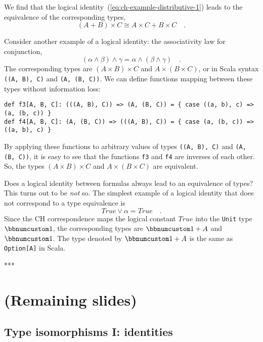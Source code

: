 We find that the logical identity~(\ref{eq:ch-example-distributive-1})
leads to the equivalence of the corresponding types,
\[
\left(A+B\right)\times C\cong A\times C+B\times C\quad.
\]

Consider another example of a logical identity: the associativity
law for conjunction,
\[
\left(\alpha\wedge\beta\right)\wedge\gamma=\alpha\wedge\left(\beta\wedge\gamma\right)\quad.
\]
The corresponding types are $(A\times B)\times C$ and $A\times(B\times C)$,
or in Scala syntax \lstinline!((A, B), C)!
and \lstinline!(A, (B, C))!.
We can define functions mapping between these types without information
loss:
\begin{lstlisting}
def f3[A, B, C]: (((A, B), C)) => (A, (B, C)) = { case ((a, b), c) => (a, (b, c)) }
def f4[A, B, C]: (A, (B, C)) => (((A, B), C)) = { case (a, (b, c)) => ((a, b), c) }
\end{lstlisting}
By applying these functions to arbitrary values of types \lstinline!((A, B), C)!
and \lstinline!(A, (B, C))!,
it is easy to see that the functions \lstinline!f3!
and \lstinline!f4! are
inverses of each other. So, the types $\left(A\times B\right)\times C$
and $A\times\left(B\times C\right)$ are equivalent.

Does a logical identity between formulas always lead to an equivalence
of types? This turns out to be \emph{not} so. The simplest example
of a logical identity that does not correspond to a type equivalence
is
\[
True\vee\alpha=True\quad.
\]
Since the CH correspondence maps the logical constant $True$ into
the \lstinline!Unit! type
$\bbnum 1$, the corresponding types are $\bbnum 1+A$ and $\bbnum 1$.
The type denoted by $\bbnum 1+A$ is the same as \lstinline!Option[A]!
in Scala.

{*}{*}{*}

\section{(Remaining slides)}

\subsection{Type isomorphisms I: identities}

